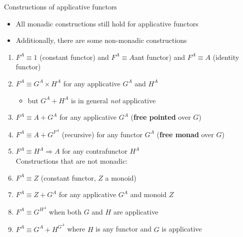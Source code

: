 \documentclass[english]{beamer}
\begin{document}
\begin{frame}{Constructions of applicative functors}
\begin{itemize}
\item All monadic constructions still hold for applicative functors
\item Additionally, there are some non-monadic constructions
\end{itemize}
\begin{enumerate}
\item $F^{A}\equiv1$ (constant functor) and $F^{A}\equiv A$ant functor) and $F^{A}\equiv A$ (identity
functor)
\item $F^{A}\equiv G^{A}\times H^{A}$ for any applicative $G^{A}$ and
$H^{A}$
\begin{itemize}
\item but $G^{A}+H^{A}$ is in general \emph{not} applicative
\end{itemize}
\item $F^{A}\equiv A+G^{A}$ for any applicative $G^{A}$ (\textbf{free
pointed} over $G$)
\item $F^{A}\equiv A+G^{F^{A}}$ (recursive) for any functor $G^{A}$ (\textbf{free
monad} over $G$)
\item $F^{A}\equiv H^{A}\Rightarrow A$ for any contrafunctor $H^{A}$\\
Constructions that are not monadic:
\item $F^{A}\equiv Z$ (constant functor, $Z$ a monoid)
\item $F^{A}\equiv Z+G^{A}$ for any applicative $G^{A}$ and monoid $Z$
\item $F^{A}\equiv G^{H^{A}}$ when both $G$ and $H$ are applicative
\item $F^{A}\equiv G^{A}+H^{G^{A}}$ where $H$ is any functor and $G$
is applicative
\end{enumerate}
\end{frame}
\end{document}
